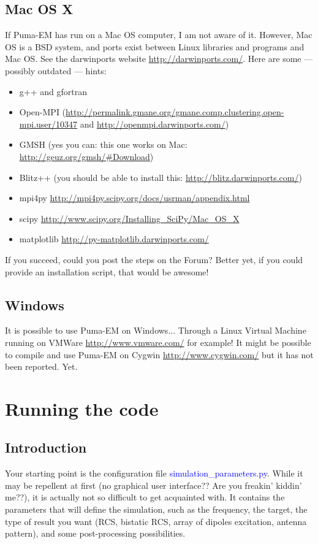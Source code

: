 \documentclass[a4paper,10pt]{book}
\newcommand{\file}[1] {\textcolor{blue}{\textsf{#1}}}
\begin{document}
\section{Mac OS X}
%
\par
If Puma-EM has run on a Mac OS computer, I am not aware of it. However, Mac OS is a BSD system, and ports exist between Linux libraries and programs and Mac OS. See the darwinports website \url{http://darwinports.com/}. Here are some --- possibly outdated --- hints:
\begin{itemize}
\item g++ and gfortran
\item Open-MPI (\url{http://permalink.gmane.org/gmane.comp.clustering.open-mpi.user/10347} and \url{http://openmpi.darwinports.com/})
\item GMSH (yes you can: this one works on Mac: \url{http://geuz.org/gmsh/#Download})
\item Blitz++ (you should be able to install this: \url{http://blitz.darwinports.com/})
\item mpi4py \url{http://mpi4py.scipy.org/docs/usrman/appendix.html}
\item scipy \url{http://www.scipy.org/Installing_SciPy/Mac_OS_X}
\item matplotlib \url{http://py-matplotlib.darwinports.com/}
\end{itemize}
If you succeed, could you post the steps on the Forum? Better yet, if you could provide an installation script, that would be awesome!


\section{Windows}
%
\par
It is possible to use Puma-EM on Windows... Through a Linux Virtual Machine running on VMWare \url{http://www.vmware.com/} for example! It might be possible to compile and use Puma-EM on Cygwin \url{http://www.cygwin.com/} but it has not been reported. Yet. 


\chapter{Running the code}

\section{Introduction}
%
\par
Your starting point is the configuration file \file{simulation\_parameters.py}. While it may be repellent at first (no graphical user interface?? Are you freakin' kiddin' me??), it is actually not so difficult to get acquainted with. It contains the parameters that will define the simulation, such as the frequency, the target, the type of result you want (RCS, bistatic RCS, array of dipoles excitation, antenna pattern), and some post-processing possibilities.
\end{document}
